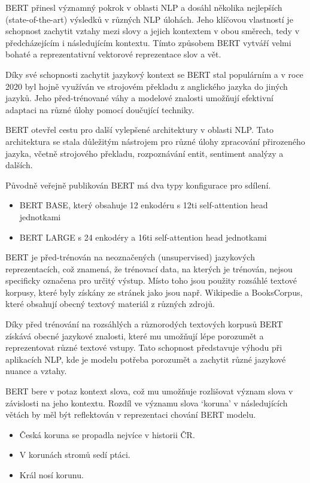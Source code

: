 BERT přinesl významný pokrok v oblasti NLP a dosáhl několika nejlepších (state-of-the-art) výsledků v různých NLP úlohách.
Jeho klíčovou vlastností je schopnost zachytit vztahy mezi slovy a jejich kontextem v obou směrech, tedy v předcházejícím i následujícím kontextu.
Tímto způsobem BERT vytváří velmi bohaté a reprezentativní vektorové reprezentace slov a vět.

Díky své schopnosti zachytit jazykový kontext se BERT stal populárním a v roce 2020 byl hojně využíván ve strojovém překladu z anglického jazyka do jiných jazyků.
Jeho před-trénované váhy a modelové znalosti umožňují efektivní adaptaci na různé úlohy pomocí doučující techniky.

BERT otevřel cestu pro další vylepšené architektury v oblasti NLP.\@
Tato architektura se stala důležitým nástrojem pro různé úlohy zpracování přirozeného jazyka, včetně strojového překladu, rozpoznávání entit, sentiment analýzy a dalších.

Původně veřejně publikován BERT má dva typy konfigurace pro sdílení.

\begin{itemize}
\item BERT BASE, který obsahuje 12 enkodéru s 12ti self-attention head jednotkami
\item BERT LARGE s 24 enkodéry a 16ti self-attention head jednotkami
\end{itemize}

BERT je před-trénován na neoznačených (unsupervised) jazykových reprezentacích, což znamená, že trénovací data, na kterých je trénován, nejsou specificky označena pro určitý výstup.
Místo toho jsou použity rozsáhlé textové korpusy, které byly získány ze stránek jako jsou např. Wikipedie a BooksCorpus, které obsahují obecný textový materiál z různých zdrojů.

Díky před trénování na rozsáhlých a různorodých textových korpusů BERT získává obecné jazykové znalosti, které mu umožňují lépe porozumět a reprezentovat různé textové vstupy.
Tato schopnost představuje výhodu při aplikacích NLP, kde je modelu potřeba porozumět a zachytit různé jazykové nuance a vztahy.

BERT bere v potaz kontext slova, což mu umožňuje rozlišovat význam slova v závislosti na jeho kontextu.
Rozdíl ve významu slova `koruna' v následujících větách by měl být reflektován v reprezentaci chování BERT modelu.

\begin{itemize}
\item Česká koruna se propadla nejvíce v historii ČR.
\item V korunách stromů sedí ptáci.
\item Král nosí korunu.
\end{itemize}

